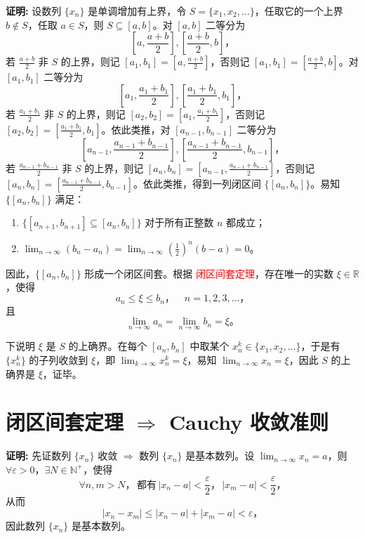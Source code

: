 \documentclass[lang=cn,newtx,10pt,scheme=chinese]{elegantbook}
\begin{document}
\textbf{证明:} 设数列 $\{x_n\}$ 是单调增加有上界，令 $S = \{x_1, x_2, \ldots\}$，任取它的一个上界 $b \notin S$，任取 $a \in S$，则 $S \subseteq [a, b]$。对 $[a, b]$ 二等分为
\[
\left[ a, \frac{a + b}{2} \right], \left[ \frac{a + b}{2}, b \right]，
\]
若 $\frac{a + b}{2}$ 非 $S$ 的上界，则记 $[a_1, b_1] = \left[ a, \frac{a + b}{2} \right]$，否则记 $[a_1, b_1] = \left[ \frac{a + b}{2}, b \right]$。对 $[a_1, b_1]$ 二等分为
\[
\left[ a_1, \frac{a_1 + b_1}{2} \right], \left[ \frac{a_1 + b_1}{2}, b_1 \right]，
\]
若 $\frac{a_1 + b_1}{2}$ 非 $S$ 的上界，则记 $[a_2, b_2] = \left[ a_1, \frac{a_1 + b_1}{2} \right]$，否则记 $[a_2, b_2] = \left[ \frac{a_1 + b_1}{2}, b_1 \right]$。依此类推，对 $[a_{n-1}, b_{n-1}]$ 二等分为
\[
\left[ a_{n-1}, \frac{a_{n-1} + b_{n-1}}{2} \right], \left[ \frac{a_{n-1} + b_{n-1}}{2}, b_{n-1} \right]，
\]
若 $\frac{a_{n-1} + b_{n-1}}{2}$ 非 $S$ 的上界，则记 $[a_n, b_n] = \left[ a_{n-1}, \frac{a_{n-1} + b_{n-1}}{2} \right]$，否则记 $[a_n, b_n] = \left[ \frac{a_{n-1} + b_{n-1}}{2}, b_{n-1} \right]$。依此类推，得到一列闭区间 $\{[a_n, b_n]\}$。易知 $\{[a_n, b_n]\}$ 满足：
\begin{enumerate}
    \item $\{[a_{n+1}, b_{n+1}] \subseteq [a_n, b_n]\}$ 对于所有正整数 $n$ 都成立；
    \item $\lim_{n \to \infty} (b_n - a_n) = \lim_{n \to \infty} \left(\frac{1}{2}\right)^n (b - a) = 0$。
\end{enumerate}

因此，$\{[a_n, b_n]\}$ 形成一个闭区间套。根据 \textcolor{red}{闭区间套定理}，存在唯一的实数 $\xi \in \mathbb{R}$，使得
\[
a_n \leq \xi \leq b_n，\quad n = 1, 2, 3, \ldots，
\]
且
\[
\lim_{n \to \infty} a_n = \lim_{n \to \infty} b_n = \xi。
\]

下说明 $\xi$ 是 $S$ 的上确界。在每个 $[a_n, b_n]$ 中取某个 $x_n^k \in \{x_1, x_2, \ldots\}$，于是有 $\{x_n^k\}$ 的子列收敛到 $\xi$，即 $\lim_{k \to \infty} x_n^k = \xi$，易知 $\lim_{n \to \infty} x_n = \xi$，因此 $S$ 的上确界是 $\xi$，证毕。

\section*{闭区间套定理 $\Rightarrow$ Cauchy 收敛准则}

\textbf{证明:} 先证数列 $\{x_n\}$ 收敛 $\Rightarrow$ 数列 $\{x_n\}$ 是基本数列。设 $\lim_{n \to \infty} x_n = a$，则 $\forall \varepsilon > 0$，$\exists N \in \mathbb{N}^+$，使得
\[
\forall n, m > N，\, 都有 \, |x_n - a| < \frac{\varepsilon}{2}，\, |x_m - a| < \frac{\varepsilon}{2}，
\]
从而
\[
|x_n - x_m| \leq |x_n - a| + |x_m - a| < \varepsilon，
\]
因此数列 $\{x_n\}$ 是基本数列。
\end{document}
